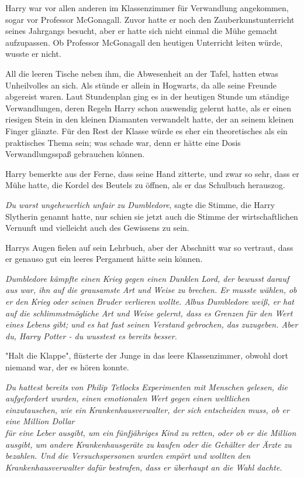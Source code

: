 {Harry war vor allen anderen im Klassenzimmer für Verwandlung angekommen, sogar vor Professor McGonagall. Zuvor hatte er noch den Zauberkunstunterricht seines Jahrgangs besucht, aber er hatte sich nicht einmal die Mühe gemacht aufzupassen. Ob Professor McGonagall den heutigen Unterricht leiten würde, wusste er nicht.

All die leeren Tische neben ihm, die Abwesenheit an der Tafel, hatten etwas Unheilvolles an sich. Als stünde er allein in Hogwarts, da alle seine Freunde abgereist waren. Laut Stundenplan ging es in der heutigen Stunde um ständige Verwandlungen, deren Regeln Harry schon auswendig gelernt hatte, als er einen riesigen Stein in den kleinen Diamanten verwandelt hatte, der an seinem kleinen Finger glänzte. Für den Rest der Klasse würde es eher ein theoretisches als ein praktisches Thema sein; was schade war, denn er hätte eine Dosis Verwandlungsspaß gebrauchen können.

Harry bemerkte aus der Ferne, dass seine Hand zitterte, und zwar so sehr, dass er Mühe hatte, die Kordel des Beutels zu öffnen, als er das Schulbuch herauszog.

\emph{Du warst ungeheuerlich unfair zu Dumbledore}, sagte die Stimme, die Harry Slytherin genannt hatte, nur schien sie jetzt auch die Stimme der wirtschaftlichen Vernunft und vielleicht auch des Gewissens zu sein.

Harrys Augen fielen auf sein Lehrbuch, aber der Abschnitt war so vertraut, dass er genauso gut ein leeres Pergament hätte sein können.

\emph{Dumbledore kämpfte einen Krieg gegen einen Dunklen Lord, der bewusst darauf aus war, ihn auf die grausamste Art und Weise zu brechen. Er musste wählen, ob er den Krieg oder seinen Bruder verlieren wollte. Albus Dumbledore weiß, er hat auf die schlimmstmögliche Art und Weise gelernt, dass es Grenzen für den Wert eines Lebens gibt; und es hat fast seinen Verstand gebrochen, das zuzugeben. Aber du, Harry Potter - du wusstest es bereits besser.}

"Halt die Klappe", flüsterte der Junge in das leere Klassenzimmer, obwohl dort niemand war, der es hören konnte.

\emph{Du hattest bereits von Philip Tetlocks Experimenten mit Menschen gelesen, die aufgefordert wurden, einen emotionalen Wert gegen einen weltlichen einzutauschen, wie ein Krankenhausverwalter, der sich entscheiden muss, ob er eine Million Dollar}\\ \emph{für eine Leber ausgibt, um ein fünfjähriges Kind zu retten, oder ob er die Million ausgibt, um andere Krankenhausgeräte zu kaufen oder die Gehälter der Ärzte zu bezahlen. Und die Versuchspersonen wurden empört und wollten den Krankenhausverwalter dafür bestrafen, dass er überhaupt an die Wahl dachte.}

}
